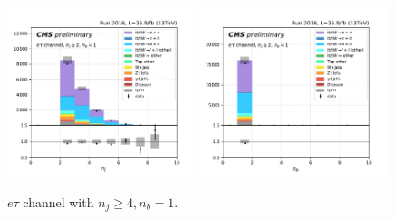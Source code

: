 \begin{figure}[ht]
    \includegraphics[width=0.49\textwidth]{chapters/Analysis/sectionPlots/figures/kinematics_pickles/etau/1b/etau_1b_nJets.pdf}
    \includegraphics[width=0.49\textwidth]{chapters/Analysis/sectionPlots/figures/kinematics_pickles/etau/1b/etau_1b_nBJets.pdf}
    
    \caption{$e\tau$ channel with $n_j\geq4, n_b=1$.}
\end{figure}

